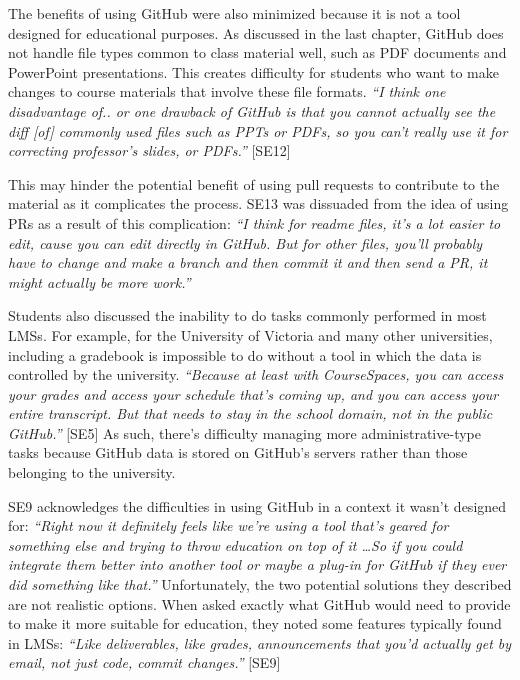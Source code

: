The benefits of using GitHub were also minimized because it is not a tool designed for educational purposes. As discussed in the last chapter, GitHub does not handle file types common to class material well, such as PDF documents and PowerPoint presentations. This creates difficulty for students who want to make changes to course materials that involve these file formats. \textit{``I think one disadvantage of.. or one drawback of GitHub is that you cannot actually see the diff [of] commonly used files such as PPTs or PDFs, so you can't really use it for correcting professor's slides, or PDFs.''} [SE12]

This may hinder the potential benefit of using pull requests to contribute to the material as it complicates the process. SE13 was dissuaded from the idea of using PRs as a result of this complication: \textit{``I think for readme files, it's a lot easier to edit, cause you can edit directly in GitHub. But for other files, you'll probably have to change and make a branch and then commit it and then send a PR, it might actually be more work.''}

Students also discussed the inability to do tasks commonly performed in most LMSs. For example, for the University of Victoria and many other universities, including a gradebook is impossible to do without a tool in which the data is controlled by the university. \textit{``Because at least with CourseSpaces, you can access your grades and access your schedule that's coming up, and you can access your entire transcript. But that needs to stay in the school domain, not in the public GitHub.''} [SE5] As such, there's difficulty managing more administrative-type tasks because GitHub data is stored on GitHub's servers rather than those belonging to the university.


SE9 acknowledges the difficulties in using GitHub in a context it wasn't designed for: \textit{``Right now it definitely feels like we're using a tool that's geared for something else and trying to throw education on top of it \ldots So if you could integrate them better into another tool or maybe a plug-in for GitHub if they ever did something like that.''} Unfortunately, the two potential solutions they described are not realistic options. When asked exactly what GitHub would need to provide to make it more suitable for education, they noted some features typically found in LMSs: \textit{``Like deliverables, like grades, announcements that you'd actually get by email, not just code, commit changes.''} [SE9]

